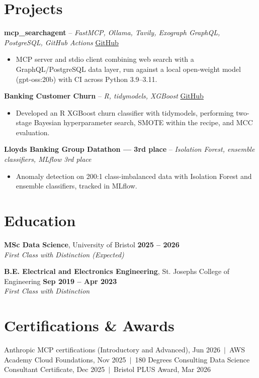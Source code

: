\documentclass[a4paper,11pt]{article}
\begin{document}
\section{Projects}
\noindent\textbf{mcp\_searchagent} -- \textit{FastMCP, Ollama, Tavily, Exograph GraphQL, PostgreSQL, GitHub Actions} \hfill \href{https://github.com/Thiruvel-AP/mcp_searchagent}{GitHub}
\begin{itemize}
  \item MCP server and stdio client combining web search with a GraphQL/PostgreSQL data layer, run against a local open-weight model (gpt-oss:20b) with CI across Python 3.9–3.11.
\end{itemize}
\vspace{3pt}
\noindent\textbf{Banking Customer Churn} -- \textit{R, tidymodels, XGBoost} \hfill \href{https://github.com/Thiruvel-AP/Banking-Customer-Churn-Prediction}{GitHub}
\begin{itemize}
  \item Developed an R XGBoost churn classifier with tidymodels, performing two-stage Bayesian hyperparameter search, SMOTE within the recipe, and MCC evaluation.
\end{itemize}
\vspace{3pt}
\noindent\textbf{Lloyd\textquotesingle{}s Banking Group Datathon — 3rd place} -- \textit{Isolation Forest, ensemble classifiers, MLflow} \hfill \textit{3rd place}
\begin{itemize}
  \item Anomaly detection on 200:1 class-imbalanced data with Isolation Forest and ensemble classifiers, tracked in MLflow.
\end{itemize}

\section{Education}
\textbf{MSc Data Science}, University of Bristol \hfill \textbf{2025 – 2026}\\ \textit{First Class with Distinction (Expected)}\par
\vspace{3pt}
\textbf{B.E. Electrical and Electronics Engineering}, St. Joseph\textquotesingle{}s College of Engineering \hfill \textbf{Sep 2019 – Apr 2023}\\ \textit{First Class with Distinction}\par

\section{Certifications \& Awards}
Anthropic MCP certifications (Introductory and Advanced), Jun 2026 \,$|$\, AWS Academy Cloud Foundations, Nov 2025 \,$|$\, 180 Degrees Consulting Data Science Consultant Certificate, Dec 2025 \,$|$\, Bristol PLUS Award, Mar 2026
\end{document}
